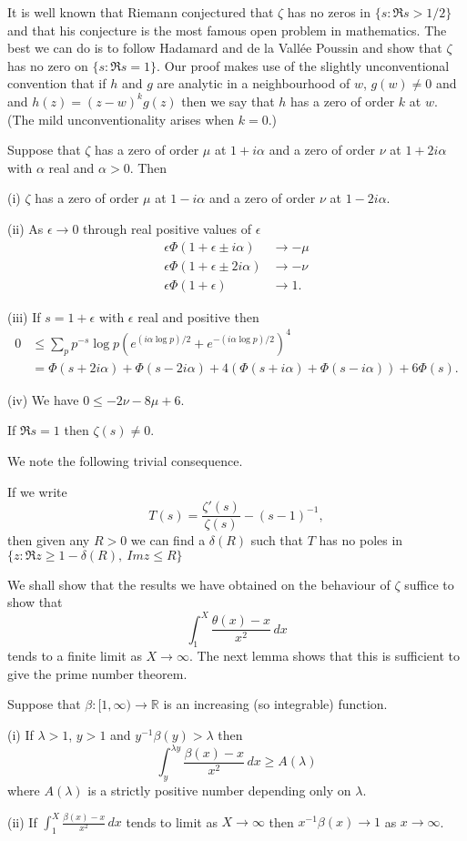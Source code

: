 It is well known that Riemann conjectured that $\zeta$
has no zeros in $\{s:\Re s>1/2\}$ and that his conjecture
is the most famous open problem in mathematics.
The best we can do is to follow Hadamard and
de la Vall\'{e}e Poussin and show that $\zeta$
has no zero on $\{s:\Re s=1\}$. Our proof makes
use of the slightly unconventional convention
that if $h$ and $g$ are analytic in a neighbourhood of $w$,
$g(w)\neq 0$ and
and $h(z)=(z-w)^{k}g(z)$ then we say that $h$ has a zero
of order $k$ at $w$. (The mild unconventionality arises
when $k=0$.)
\begin{lemma} Suppose that $\zeta$ has a zero of order
$\mu$ at $1+i\alpha$ 
and a zero of order $\nu$ at $1+2i\alpha$
with $\alpha$ real and $\alpha>0$. Then

(i) $\zeta$ has a zero of order $\mu$ at $1-i\alpha$
and a zero of order $\nu$ at $1-2i\alpha$.

(ii) As $\epsilon\rightarrow 0$ through
real positive values of $\epsilon$
\begin{align*}
\epsilon\Phi(1+\epsilon \pm i\alpha)&\rightarrow -\mu\\
\epsilon\Phi(1+\epsilon \pm 2i\alpha)&\rightarrow -\nu\\
\epsilon\Phi(1+\epsilon)&\rightarrow 1.
\end{align*}

(iii) If $s=1+\epsilon$ with $\epsilon$ real and positive
then
\begin{align*}
0&\leq\sum_{p}p^{-s}\log p (e^{(i\alpha\log p)/2}+
e^{-(i\alpha\log p)/2})^{4}\\
&=\Phi(s+2i\alpha)+\Phi(s-2i\alpha)
+4(\Phi(s+i\alpha)+\Phi(s-i\alpha))
+6\Phi(s).
\end{align*}

(iv) We have $0\leq-2\nu-8\mu+6$.
\end{lemma}
\begin{theorem} If $\Re s=1$ then $\zeta(s)\neq 0$.
\end{theorem}
We note the following trivial consequence.
\begin{lemma}
If we write
\[T(s)=\frac{\zeta'(s)}{\zeta(s)}-(s-1)^{-1},\]
then given any $R>0$ we can find a $\delta(R)$
such that $T$ has no poles in
$\{z:\Re z\geq 1-\delta(R),\ Im z\leq R\}$
\end{lemma}

We shall show that the results we have obtained on 
the behaviour of $\zeta$ suffice to show that
\[\int_{1}^{X}\frac{\theta(x)-x}{x^{2}}\,dx\]
tends to a finite limit as $X\rightarrow\infty$.
The next lemma shows that this is sufficient to
give the prime number theorem.
\begin{lemma} Suppose that 
$\beta:[1,\infty)\rightarrow{\mathbb R}$
is an increasing (so integrable) function.

(i) If $\lambda>1$, $y>1$ and $y^{-1}\beta(y)>\lambda$
then
\[\int_{y}^{\lambda y}\frac{\beta(x)-x}{x^{2}}\,dx
\geq A(\lambda)\]
where $A(\lambda)$ is a strictly positive number
depending only on $\lambda$.

(ii) If $\int_{1}^{X}\frac{\beta(x)-x}{x^{2}}\,dx$
tends to limit as $X\rightarrow\infty$ then
$x^{-1}\beta(x)\rightarrow 1$ as $x\rightarrow\infty$.
\end{lemma}

